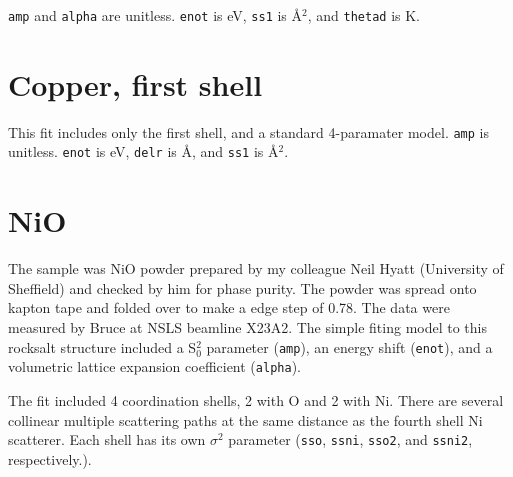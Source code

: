 \documentclass{article}
\let\stdsection\section
\renewcommand\section{\newpage\stdsection}
\begin{document}
\texttt{amp} and \texttt{alpha} are unitless.  \texttt{enot} is eV,
\texttt{ss1} is \AA$^2$, and \texttt{thetad} is K.


\renewcommand{\feffMaterial}{Copper} %
\renewcommand{\feffRone}{3}          %
\renewcommand{\feffRtwo}{4}          %
\renewcommand{\feffRthree}{5}        %
\renewcommand{\feffRfour}{5.5}       %
\renewcommand{\feffRfive}{6}         %
\renewcommand{\feffFirst}{}     %

\small

\scfsevenplots



\section{Copper, first shell}

\normalsize
This fit includes only the first shell, and a standard 4-paramater
model.  \texttt{amp} is unitless.  \texttt{enot} is eV, \texttt{delr}
is \AA, and \texttt{ss1} is \AA$^2$.

\renewcommand{\feffFirst}{_1st}

\small

\scfsevenplots





\section{NiO}

\normalsize

The sample was NiO powder prepared by my colleague Neil Hyatt
(University of Sheffield) and checked by him for phase purity.  The
powder was spread onto kapton tape and folded over to make a edge step
of 0.78.  The data were measured by Bruce at NSLS beamline X23A2.  The
simple fiting model to this rocksalt structure included a S$_0^2$
parameter (\texttt{amp}), an energy shift (\texttt{enot}), and a
volumetric lattice expansion coefficient (\texttt{alpha}).

The fit included 4 coordination shells, 2 with O and 2 with Ni.  There
are several collinear multiple scattering paths at the same distance
as the fourth shell Ni scatterer.  Each shell has its own $\sigma^2$
parameter (\texttt{sso}, \texttt{ssni}, \texttt{sso2}, and
\texttt{ssni2}, respectively.).
\end{document}
